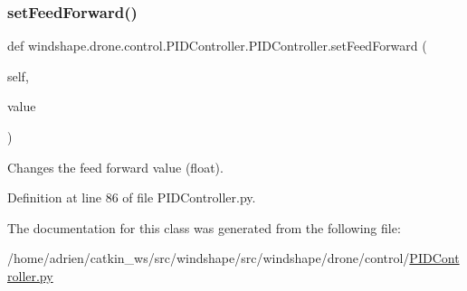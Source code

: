 \subsubsection{\texorpdfstring{set\+Feed\+Forward()}{setFeedForward()}}
{\footnotesize\ttfamily def windshape.\+drone.\+control.\+P\+I\+D\+Controller.\+P\+I\+D\+Controller.\+set\+Feed\+Forward (\begin{DoxyParamCaption}\item[{}]{self,  }\item[{}]{value }\end{DoxyParamCaption})}

\begin{DoxyVerb}Changes the feed forward value (float).\end{DoxyVerb}
 

Definition at line 86 of file P\+I\+D\+Controller.\+py.



The documentation for this class was generated from the following file\+:\begin{DoxyCompactItemize}
\item 
/home/adrien/catkin\+\_\+ws/src/windshape/src/windshape/drone/control/\mbox{\hyperlink{_p_i_d_controller_8py}{P\+I\+D\+Controller.\+py}}\end{DoxyCompactItemize}
